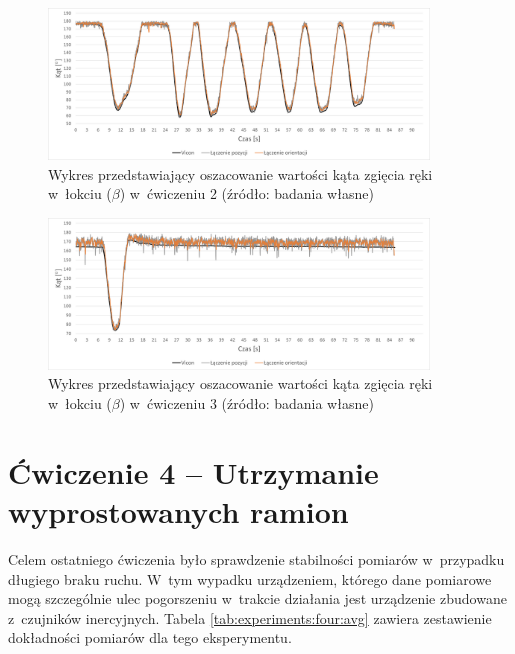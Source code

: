 \begin{figure}[!htb]
	\centering
	\includegraphics[width=0.9\textwidth]{images/200/angle.png}
	\caption{Wykres przedstawiający oszacowanie wartości kąta zgięcia ręki w~łokciu ($\beta$) w~ćwiczeniu 2 (źródło: badania własne)}
	\label{fig:experiments:second:angle}
\end{figure}
\begin{figure}[!htb]
	\centering
	\includegraphics[width=0.9\textwidth]{images/300/angle.png}
	\caption{Wykres przedstawiający oszacowanie wartości kąta zgięcia ręki w~łokciu ($\beta$) w~ćwiczeniu 3  (źródło: badania własne)}
	\label{fig:experiments:third:angle}
\end{figure}
																				
\section*{Ćwiczenie 4 -- Utrzymanie wyprostowanych ramion}
Celem ostatniego ćwiczenia było sprawdzenie stabilności pomiarów w~przypadku długiego braku ruchu. W~tym wypadku urządzeniem, którego dane pomiarowe mogą szczególnie ulec pogorszeniu w~trakcie działania jest urządzenie zbudowane z~czujników inercyjnych. Tabela \ref{tab:experiments:four:avg} zawiera zestawienie dokładności pomiarów dla tego eksperymentu.
																				
